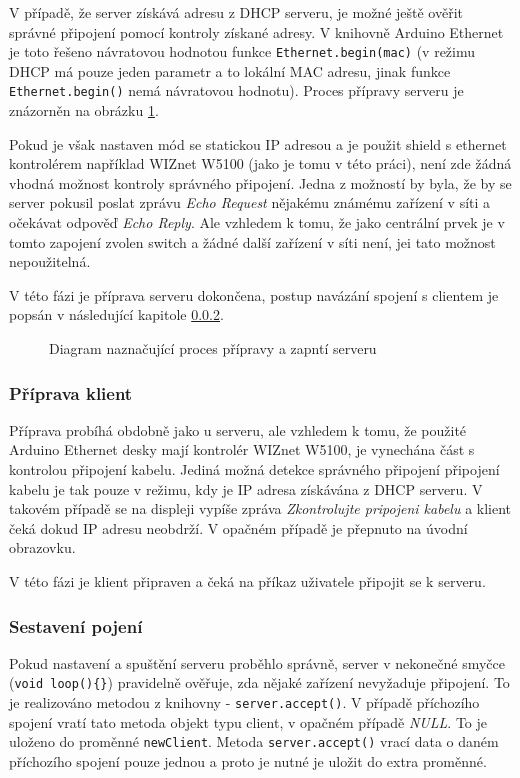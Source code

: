 V případě, že server získává adresu z DHCP serveru, je možné ještě ověřit správné připojení pomocí kontroly získané adresy. V knihovně Arduino Ethernet \cite{EthLib} je toto řešeno návratovou hodnotou funkce \texttt{Ethernet.begin(mac)} (v režimu DHCP má pouze jeden parametr a to lokální MAC adresu, jinak funkce \texttt{Ethernet.begin()} nemá návratovou hodnotu). Proces přípravy serveru je znázorněn na obrázku \ref{fig:flow:serverStartUp}.

Pokud je však nastaven mód se statickou IP adresou a je použit shield s ethernet kontrolérem například WIZnet W5100 (jako je tomu v této práci), není zde žádná vhodná možnost kontroly správného připojení. Jedna z možností by byla, že by se server pokusil poslat zprávu \textit{Echo Request} nějakému známému zařízení v síti a očekávat odpověď \textit{Echo Reply}. Ale vzhledem k tomu, že jako centrální prvek je v tomto zapojení zvolen switch a žádné další zařízení v síti není, jei tato možnost nepoužitelná.

V této fázi je příprava serveru dokončena, postup navázání spojení s clientem je popsán v následující kapitole \ref{sec:connection_communication}.

\begin{figure}
  \centering
  
  \caption{\label{fig:flow:serverStartUp} Diagram naznačující proces přípravy a zapntí serveru}
\end{figure}




\subsubsection{Příprava klient}
Příprava probíhá obdobně jako u serveru, ale vzhledem k tomu, že použité Arduino Ethernet desky mají kontrolér WIZnet W5100, je vynechána část s kontrolou připojení kabelu. Jediná možná detekce správného připojení připojení kabelu je tak pouze v režimu, kdy je IP adresa získávána z DHCP serveru. V takovém případě se na displeji vypíše zpráva \textit{Zkontrolujte pripojeni kabelu} a klient čeká dokud IP adresu neobdrží. V opačném případě je přepnuto na úvodní obrazovku.

V této fázi je klient připraven a čeká na příkaz uživatele připojit se k serveru.

\subsubsection{Sestavení pojení}
\label{sec:connection_communication}
Pokud nastavení a spuštění serveru proběhlo správně, server v nekonečné smyčce (\texttt{void loop()\{\}}) pravidelně ověřuje, zda nějaké zařízení nevyžaduje připojení. To je realizováno metodou z knihovny \cite{EthLib} - \texttt{server.accept()}. V případě příchozího spojení vratí tato metoda objekt typu client, v opačném případě \textit{NULL}. To je uloženo do proměnné \texttt{newClient}. Metoda \texttt{server.accept()} vrací data o daném příchozího spojení pouze jednou a proto je nutné je uložit do extra proměnné.

